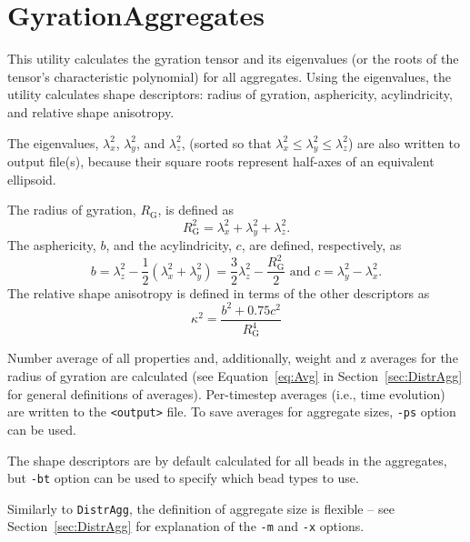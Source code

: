 \section{GyrationAggregates} \label{sec:GyrationAggregates}

This utility calculates the gyration tensor and its eigenvalues (or the
roots of the tensor's characteristic polynomial) for all aggregates. Using
the eigenvalues, the utility calculates shape descriptors:
radius of gyration, asphericity, acylindricity, and relative shape
anisotropy.

The eigenvalues, $\lambda_x^2$, $\lambda_y^2$, and $\lambda_z^2$, (sorted
so that $\lambda_x^2\leq\lambda_y^2\leq\lambda_z^2$) are also written to
output file(s), because their square roots represent half-axes of an
equivalent ellipsoid.

The radius of gyration, $R_{\mathrm{G}}$, is defined as
\begin{equation} \label{eq:R_G}
  R_{\mathrm{G}}^2 = \lambda_x^2 + \lambda_y^2 + \lambda_z^2.
\end{equation}
The asphericity, $b$, and the acylindricity, $c$, are defined,
respectively, as
\begin{equation} \label{eq:b}
  b= \lambda_z^2 - \frac{1}{2}(\lambda_x^2 + \lambda_y^2) =
    \frac{3}{2}\lambda_z^2 - \frac{R_{\mathrm{G}}^2}{2}
  \mbox{ \ \ and \ \ }
  c = \lambda_y^2 - \lambda_x^2.
\end{equation}
The relative shape anisotropy is defined in terms of the other descriptors
as
\begin{equation} \label{eq:anis}
  \kappa^2 = \frac{b^2 + 0.75 c^2}{R_{\mathrm{G}}^4}
\end{equation}

Number average of all properties and, additionally, weight and z averages
for the radius of gyration are calculated (see Equation~\eqref{eq:Avg} in
Section~\ref{sec:DistrAgg} for general definitions of averages).
Per-timestep averages (i.e., time evolution) are written to the
\texttt{<output>} file. To save averages for aggregate sizes, \texttt{-ps}
option can be used.

The shape descriptors are by default calculated for all beads in the
aggregates, but \texttt{-bt} option can be used to specify which bead types
to use.

Similarly to \texttt{DistrAgg}, the definition of aggregate size is
flexible -- see Section~\ref{sec:DistrAgg} for explanation of the
\texttt{-m} and \texttt{-x} options.


